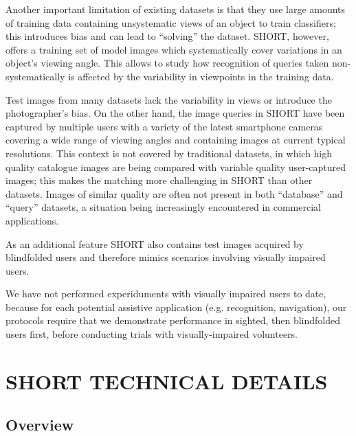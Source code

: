 Another important limitation of existing datasets is that they use large amounts of training data containing unsystematic views of an object to train classifiers; this introduces bias and can lead to ``solving'' the dataset. SHORT, however, offers a training set of model images which systematically cover variations in an object's viewing angle. This allows to study how recognition of queries taken non-systematically is affected by the variability in viewpoints in the training data.

Test images from many datasets lack the variability in views or introduce the photographer's bias. On the other hand, the image queries in SHORT have been captured by multiple users with a variety of the latest smartphone cameras covering a wide range of viewing angles and containing images at current typical resolutions. This context is not covered by traditional datasets, in which high quality catalogue images are being compared with variable quality user-captured images; this makes the matching more challenging in SHORT than other datasets. Images of similar quality are often not present in both ``database'' and ``query'' datasets, a situation being increasingly encountered in commercial applications.

As an additional feature SHORT also contains test images acquired by blindfolded users and therefore mimics scenarios involving visually impaired users. 

We have not performed experiduments with visually impaired users to date, because for each potential assistive application (e.g. recognition, navigation), our protocols require that we demonstrate performance in sighted, then blindfolded users first, before conducting trials with visually-impaired volunteers. 

\section{SHORT TECHNICAL DETAILS} \label{sec:short}

\subsection{Overview}

